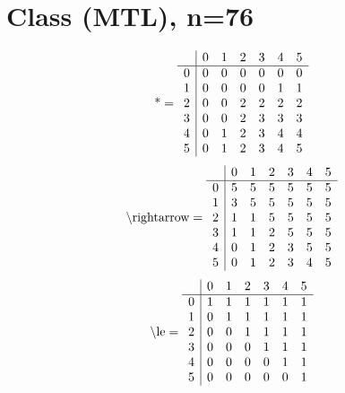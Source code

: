 \documentclass[11pt]{article}
\begin{document}
\section{Class (MTL), n=76}
\[\text{*} = 
\begin{array}{r | r r r r r r}
 & 0 & 1 & 2 & 3 & 4 & 5 \\ \hline
0 & 0 & 0 & 0 & 0 & 0 & 0 \\
1 & 0 & 0 & 0 & 0 & 1 & 1 \\
2 & 0 & 0 & 2 & 2 & 2 & 2 \\
3 & 0 & 0 & 2 & 3 & 3 & 3 \\
4 & 0 & 1 & 2 & 3 & 4 & 4 \\
5 & 0 & 1 & 2 & 3 & 4 & 5 \\
\end{array}
\]
\[\text{\textbackslash rightarrow} = 
\begin{array}{r | r r r r r r}
 & 0 & 1 & 2 & 3 & 4 & 5 \\ \hline
0 & 5 & 5 & 5 & 5 & 5 & 5 \\
1 & 3 & 5 & 5 & 5 & 5 & 5 \\
2 & 1 & 1 & 5 & 5 & 5 & 5 \\
3 & 1 & 1 & 2 & 5 & 5 & 5 \\
4 & 0 & 1 & 2 & 3 & 5 & 5 \\
5 & 0 & 1 & 2 & 3 & 4 & 5 \\
\end{array}
\]
\[\text{\textbackslash le} = 
\begin{array}{r | r r r r r r}
 & 0 & 1 & 2 & 3 & 4 & 5 \\ \hline
0 & 1 & 1 & 1 & 1 & 1 & 1 \\
1 & 0 & 1 & 1 & 1 & 1 & 1 \\
2 & 0 & 0 & 1 & 1 & 1 & 1 \\
3 & 0 & 0 & 0 & 1 & 1 & 1 \\
4 & 0 & 0 & 0 & 0 & 1 & 1 \\
5 & 0 & 0 & 0 & 0 & 0 & 1 \\
\end{array}
\]
\end{document}
